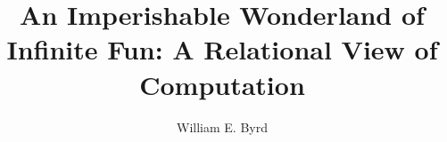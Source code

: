 
\title{An Imperishable Wonderland of Infinite Fun: A Relational View of Computation}

\author{William E. Byrd}




